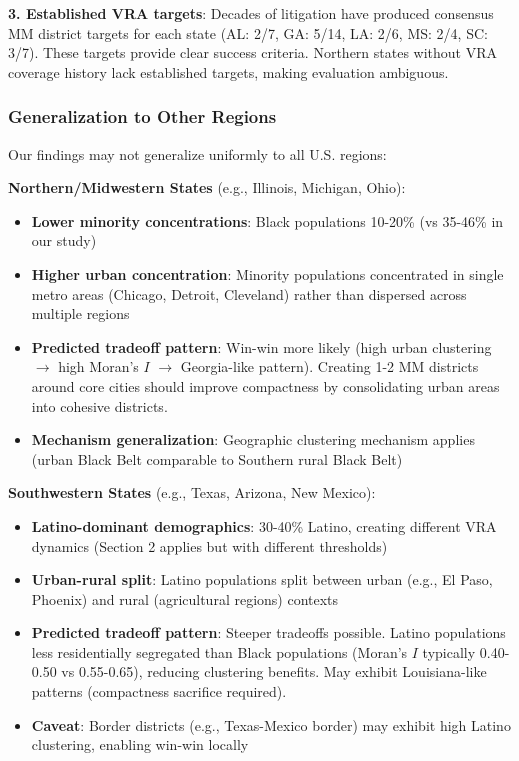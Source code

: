 \textbf{3. Established VRA targets}: Decades of litigation have produced consensus MM district targets for each state (AL: 2/7, GA: 5/14, LA: 2/6, MS: 2/4, SC: 3/7). These targets provide clear success criteria. Northern states without VRA coverage history lack established targets, making evaluation ambiguous.

\subsubsection{Generalization to Other Regions}

Our findings may not generalize uniformly to all U.S. regions:

\textbf{Northern/Midwestern States} (e.g., Illinois, Michigan, Ohio):
\begin{itemize}
    \item \textbf{Lower minority concentrations}: Black populations 10-20\% (vs 35-46\% in our study)
    \item \textbf{Higher urban concentration}: Minority populations concentrated in single metro areas (Chicago, Detroit, Cleveland) rather than dispersed across multiple regions
    \item \textbf{Predicted tradeoff pattern}: Win-win more likely (high urban clustering $\to$ high Moran's $I$ $\to$ Georgia-like pattern). Creating 1-2 MM districts around core cities should improve compactness by consolidating urban areas into cohesive districts.
    \item \textbf{Mechanism generalization}: Geographic clustering mechanism applies (urban Black Belt comparable to Southern rural Black Belt)
\end{itemize}

\textbf{Southwestern States} (e.g., Texas, Arizona, New Mexico):
\begin{itemize}
    \item \textbf{Latino-dominant demographics}: 30-40\% Latino, creating different VRA dynamics (Section 2 applies but with different thresholds)
    \item \textbf{Urban-rural split}: Latino populations split between urban (e.g., El Paso, Phoenix) and rural (agricultural regions) contexts
    \item \textbf{Predicted tradeoff pattern}: Steeper tradeoffs possible. Latino populations less residentially segregated than Black populations (Moran's $I$ typically 0.40-0.50 vs 0.55-0.65), reducing clustering benefits. May exhibit Louisiana-like patterns (compactness sacrifice required).
    \item \textbf{Caveat}: Border districts (e.g., Texas-Mexico border) may exhibit high Latino clustering, enabling win-win locally
\end{itemize}

